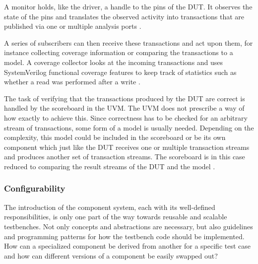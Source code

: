 A monitor holds, like the driver, a handle to the pins of the DUT. It observes the state of the pins and translates
the observed activity into transactions that are published via one or multiple analysis ports \cite[Ch. 4.3]{mehta2018asic}.

A series of subscribers can then receive these transactions and act upon them, for instance collecting coverage
information or comparing the transactions to a model. A coverage collector looks at the incoming transactions and
uses SystemVerilog functional coverage features to keep track of statistics such as whether a read was performed
after a write \cite[Ch. 4.3]{mehta2018asic}.

The task of verifying that the transactions produced by the DUT are correct is handled by the scoreboard in the UVM.
The UVM does not prescribe a way of how exactly to achieve this. Since correctness has to be checked for an arbitrary
stream of transactions, some form of a model is usually needed. Depending on the complexity, this model could be
included in the scoreboard or be its own component which just like the DUT receives one or multiple transaction
streams and produces another set of transaction streams. The scoreboard is in this case reduced to comparing the
result streams of the DUT and the model \cite[Ch. 4.3]{mehta2018asic}.

\subsubsection{Configurability} %

The introduction of the component system, each with its well-defined responsibilities, is only one part of the way
towards reusable and scalable testbenches. Not only concepts and abstractions are necessary, but also guidelines and
programming patterns for how the testbench code should be implemented. How can a specialized component be derived
from another for a specific test case and how can different versions of a component be easily swapped out?

